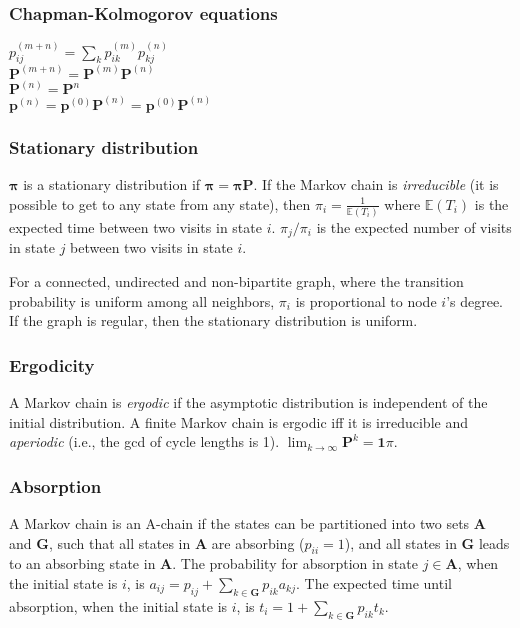 \subsubsection{Chapman-Kolmogorov equations}
$p_{ij}^{(m+n)}=\sum_k p_{ik}^{(m)}p_{kj}^{(n)}$\\
$\mathbf{P}^{(m+n)} = \mathbf{P}^{(m)}\mathbf{P}^{(n)}$\\
$\mathbf{P}^{(n)} = \mathbf{P}^n$\\
$\mathbf{p}^{(n)} = \mathbf{p}^{(0)}\mathbf{P}^{(n)} = \mathbf{p}^{(0)}\mathbf{P}^{(n)}$

\subsubsection{Stationary distribution}
$\mathbf{\pi}$ is a stationary distribution if $\mathbf{\pi} = \mathbf{\pi P}$. If the Markov chain is \emph{irreducible} (it is possible to get to any state from any state), then $\pi_i = \frac{1}{\mathbb{E}(T_i)}$ where $\mathbb{E}(T_i)$  is the expected time between two visits in state $i$. $\pi_j/\pi_i$ is the expected number of visits in state $j$ between two visits in state $i$.

For a connected, undirected and non-bipartite graph, where the transition probability is uniform among all neighbors, $\pi_i$ is proportional to node $i$'s degree. If the graph is regular, then the stationary distribution is uniform.

\subsubsection{Ergodicity}
A Markov chain is \emph{ergodic} if the asymptotic distribution is independent of the initial distribution. A finite Markov chain is ergodic iff it is irreducible and \emph{aperiodic} (i.e., the gcd of cycle lengths is 1). $\lim_{k\rightarrow\infty}\mathbf{P}^k = \mathbf{1}\pi$.

\subsubsection{Absorption}
A Markov chain is an A-chain if the states can be partitioned into two sets $\mathbf{A}$ and $\mathbf{G}$, such that all states in $\mathbf{A}$ are absorbing ($p_{ii}=1$), and all states in $\mathbf{G}$ leads to an absorbing state in $\mathbf{A}$. The probability for absorption in state $j\in\mathbf{A}$, when the initial state is $i$, is $a_{ij} = p_{ij}+\sum_{k\in\mathbf{G}} p_{ik}a_{kj}$. The expected time until absorption, when the initial state is $i$, is $t_i = 1+\sum_{k\in\mathbf{G}}p_{ik}t_k$.
